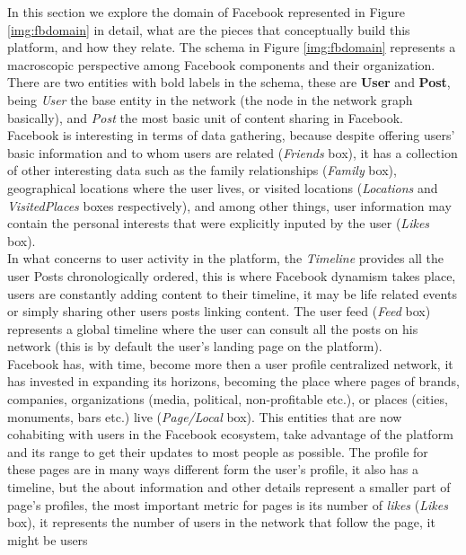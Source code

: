 \indent In this section we explore the domain of Facebook represented in Figure \ref{img:fbdomain} in detail, what are the pieces that conceptually build
this platform, and how they relate. The schema in Figure \ref{img:fbdomain} represents a macroscopic perspective among Facebook components and their organization.\\
\indent There are two entities with bold labels in the schema, these are \textbf{User} and \textbf{Post}, being
\textit{User} the base entity in the network (the node in the network graph basically), and \textit{Post} the most basic unit of content sharing in Facebook.\\
\indent Facebook is interesting in terms of data gathering, because despite offering users' basic information
and to whom users are related (\textit{Friends} box), it has a collection of other interesting data
such as the family relationships (\textit{Family} box), geographical locations where the user lives, or
visited locations (\textit{Locations} and \textit{VisitedPlaces} boxes respectively), and among other things, user information
may contain the personal interests that were explicitly inputed by the user (\textit{Likes} box).\\
\indent In what concerns to user activity in the platform, the \textit{Timeline} provides all the user
Posts chronologically ordered, this is where Facebook dynamism takes place, users are constantly
adding content to their timeline, it may be life related events or simply sharing other users posts linking content. The user feed (\textit{Feed} box) represents
a global timeline where the user can consult all the posts on his network (this is by default the user's landing page on the platform).\\
\indent Facebook has, with time, become more then a user profile centralized network, it has invested in expanding its horizons, becoming
the place where pages of brands, companies, organizations (media, political, non-profitable etc.), or places (cities, monuments, bars etc.) live (\textit{Page/Local} box).
This entities that are now cohabiting with users in the Facebook ecosystem, take advantage of the platform and its range to get their updates to most people as possible. The profile
for these pages are in many ways different form the user's profile, it also has a timeline, but the about information and other details represent a smaller part of page's profiles,
the most important metric for pages is its number of \textit{likes} (\textit{Likes} box), it represents the number of users in the network that follow the page, it might be users
